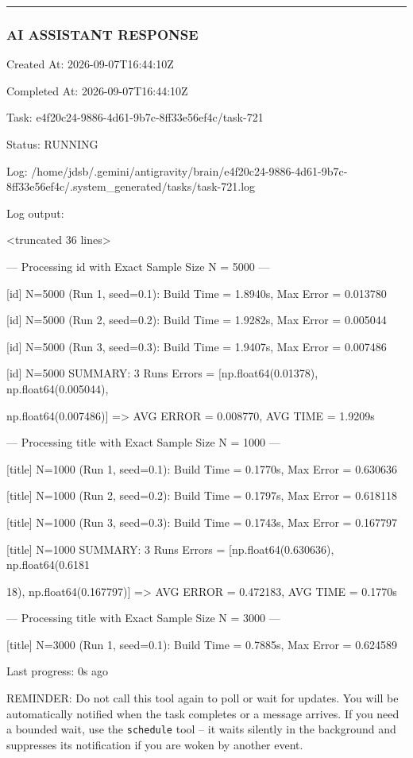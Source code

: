 \documentclass[11pt,a4paper]{article}
\begin{document}
\hrule

\subsubsection{AI ASSISTANT RESPONSE}

Created At: 2026-09-07T16:44:10Z

Completed At: 2026-09-07T16:44:10Z

Task: e4f20c24-9886-4d61-9b7c-8ff33e56ef4c/task-721

Status: RUNNING

Log: /home/jdsb/.gemini/antigravity/brain/e4f20c24-9886-4d61-9b7c-8ff33e56ef4c/.system\_generated/tasks/task-721.log

Log output:

<truncated 36 lines>


--- Processing id with Exact Sample Size N = 5000 ---

[id] N=5000 (Run 1, seed=0.1): Build Time = 1.8940s, Max Error = 0.013780

[id] N=5000 (Run 2, seed=0.2): Build Time = 1.9282s, Max Error = 0.005044

[id] N=5000 (Run 3, seed=0.3): Build Time = 1.9407s, Max Error = 0.007486

[id] N=5000 SUMMARY: 3 Runs Errors = [np.float64(0.01378), np.float64(0.005044),

np.float64(0.007486)] => AVG ERROR = 0.008770, AVG TIME = 1.9209s


--- Processing title with Exact Sample Size N = 1000 ---

[title] N=1000 (Run 1, seed=0.1): Build Time = 0.1770s, Max Error = 0.630636

[title] N=1000 (Run 2, seed=0.2): Build Time = 0.1797s, Max Error = 0.618118

[title] N=1000 (Run 3, seed=0.3): Build Time = 0.1743s, Max Error = 0.167797

[title] N=1000 SUMMARY: 3 Runs Errors = [np.float64(0.630636), np.float64(0.6181

18), np.float64(0.167797)] => AVG ERROR = 0.472183, AVG TIME = 0.1770s

--- Processing title with Exact Sample Size N = 3000 ---

[title] N=3000 (Run 1, seed=0.1): Build Time = 0.7885s, Max Error = 0.624589


Last progress: 0s ago



REMINDER: Do not call this tool again to poll or wait for updates. You will be automatically notified when the task completes or a message arrives. If you need a bounded wait, use the \texttt{schedule} tool -- it waits silently in the background and suppresses its notification if you are woken by another event.
\end{document}
